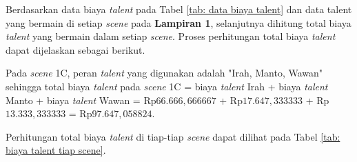 {    Berdasarkan data biaya \textit{talent} pada Tabel \ref{tab: data biaya talent} dan data talent yang bermain di setiap \textit{scene} pada \textbf{Lampiran 1},
    selanjutnya dihitung total biaya \textit{talent} yang bermain dalam setiap \textit{scene}.
    Proses perhitungan total biaya \textit{talent} dapat dijelaskan sebagai berikut.

    \noindent
    Pada \textit{scene} 1C, peran \textit{talent} yang digunakan adalah "Irah, Manto, Wawan" sehingga total biaya \textit{talent}
    pada \textit{scene} 1C = biaya \textit{talent} Irah + biaya \textit{talent} Manto + biaya \textit{talent} Wawan = Rp$66.666,666667$ + Rp$17.647,333333$ + Rp$13.333,333333$ = Rp$97.647,058824$.

    \noindent
    Perhitungan total biaya \textit{talent} di tiap-tiap \textit{scene} dapat dilihat pada Tabel \ref{tab: biaya talent tiap scene}.

}
